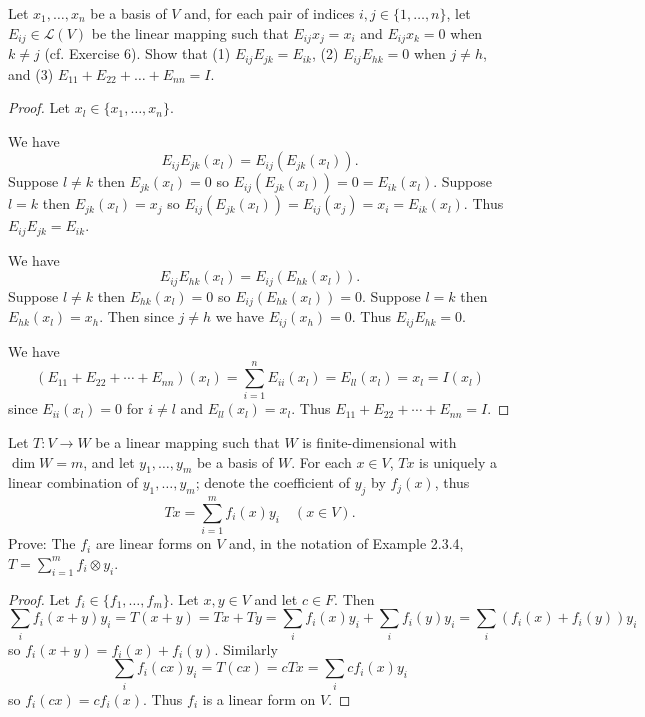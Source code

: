 \begin{tcolorbox}[title=Exercise 8, breakable]
    Let $x_1, \ldots, x_n$ be a basis of $V$ and, for each pair of indices 
    $i, j \in \{1, \ldots, n\}$, let $E_{ij} \in \mathcal{L}(V)$ be the linear mapping such that 
    $E_{ij} x_j = x_i$ and $E_{ij} x_k = 0$ when $k \ne j$ (cf. Exercise 6). Show that 
    (1) $E_{ij} E_{jk} = E_{ik}$, (2) $E_{ij} E_{hk} = 0$ when $j \ne h$, and 
    (3) $E_{11} + E_{22} + \ldots + E_{nn} = I$.
\end{tcolorbox}

\begin{proof}
    Let $x_l \in \{x_1, \ldots, x_n\}$.

    We have
    \[E_{ij} E_{jk}(x_l) = E_{ij}(E_{jk}(x_l)).\]
    Suppose $l \ne k$ then $E_{jk}(x_l) = 0$ so $E_{ij}(E_{jk}(x_l)) = 0 = E_{ik}(x_l)$.
    Suppose $l = k$ then $E_{jk}(x_l) = x_j$ so $E_{ij}(E_{jk}(x_l)) = E_{ij}(x_j) = x_i = E_{ik}(x_l)$.
    Thus $E_{ij} E_{jk} = E_{ik}$.

    We have
    \[E_{ij} E_{hk}(x_l) = E_{ij}(E_{hk}(x_l)).\]
    Suppose $l \ne k$ then $E_{hk}(x_l) = 0$ so $E_{ij}(E_{hk}(x_l)) = 0$.
    Suppose $l = k$ then $E_{hk}(x_l) = x_h$.
    Then since $j \ne h$ we have $E_{ij}(x_h) = 0$.
    Thus $E_{ij} E_{hk} = 0$.

    We have
    \[(E_{11} + E_{22} + \cdots + E_{nn})(x_l) = \sum_{i=1}^n E_{ii}(x_l) = E_{ll}(x_l) = x_l = I(x_l)\]
    since $E_{ii}(x_l) = 0$ for $i \ne l$ and $E_{ll}(x_l) = x_l$.
    Thus $E_{11} + E_{22} + \cdots + E_{nn} = I$.
\end{proof}

\begin{tcolorbox}[title=Exercise 9, breakable]
    Let $T : V \to W$ be a linear mapping such that $W$ is finite-dimensional 
    with $\dim W = m$, and let $y_1, \ldots, y_m$ be a basis of $W$. For each 
    $x \in V$, $Tx$ is uniquely a linear combination of $y_1, \ldots, y_m$; denote 
    the coefficient of $y_j$ by $f_j(x)$, thus
    \[Tx = \sum_{i=1}^m f_i(x) y_i \quad (x \in V).\]
    Prove: The $f_i$ are linear forms on $V$ and, in the notation of Example 
    2.3.4, $T = \sum_{i=1}^m f_i \otimes y_i$.
\end{tcolorbox}

\begin{proof}
    Let $f_i \in \{f_1, \ldots, f_m\}$.
    Let $x, y \in V$ and let $c \in F$.
    Then
    \[\sum_i f_i(x + y) y_i = T(x + y) = Tx + Ty = \sum_i f_i(x) y_i + \sum_i f_i(y) y_i = \sum_i (f_i(x) + f_i(y)) y_i\]
    so $f_i(x + y) = f_i(x) + f_i(y)$.
    Similarly
    \[\sum_i f_i(cx) y_i = T(cx) = cTx = \sum_i cf_i(x) y_i\]
    so $f_i(cx) = cf_i(x)$.
    Thus $f_i$ is a linear form on $V$.
\end{proof}

